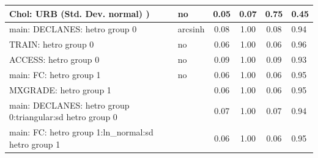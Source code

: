 \begin{table}
\begin{center}
\begin{tabular}{|l|l|c|c|c|l|}
			\hline
			 Chol: URB (Std. Dev. normal) ) & no & 0.05 & 0.07 & 0.75 & 0.45 \\
			\hline
			main: DECLANES: hetro group 0 & arcsinh & 0.08 & 1.00 & 0.08 & 0.94 \\
			\hline
			TRAIN: hetro group 0 & no & 0.06 & 1.00 & 0.06 & 0.96 \\
			\hline
			ACCESS: hetro group 0 & no & 0.09 & 1.00 & 0.09 & 0.93 \\
			\hline
			main: FC: hetro group 1 & no & 0.06 & 1.00 & 0.06 & 0.95 \\
			\hline
			MXGRADE: hetro group 1 &  & 0.06 & 1.00 & 0.06 & 0.95 \\
			\hline
			main: DECLANES: hetro group 0:triangular:sd  hetro group 0 &  & 0.07 & 1.00 & 0.07 & 0.94 \\
			\hline
			main: FC: hetro group 1:ln_normal:sd  hetro group 1 &  & 0.06 & 1.00 & 0.06 & 0.95 \\
			\hline
		\end{tabular}
	\end{center}
\end{table}